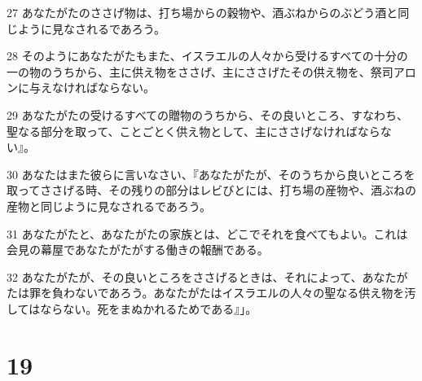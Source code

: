 \par 27 あなたがたのささげ物は、打ち場からの穀物や、酒ぶねからのぶどう酒と同じように見なされるであろう。
\par 28 そのようにあなたがたもまた、イスラエルの人々から受けるすべての十分の一の物のうちから、主に供え物をささげ、主にささげたその供え物を、祭司アロンに与えなければならない。
\par 29 あなたがたの受けるすべての贈物のうちから、その良いところ、すなわち、聖なる部分を取って、ことごとく供え物として、主にささげなければならない』。
\par 30 あなたはまた彼らに言いなさい、『あなたがたが、そのうちから良いところを取ってささげる時、その残りの部分はレビびとには、打ち場の産物や、酒ぶねの産物と同じように見なされるであろう。
\par 31 あなたがたと、あなたがたの家族とは、どこでそれを食べてもよい。これは会見の幕屋であなたがたがする働きの報酬である。
\par 32 あなたがたが、その良いところをささげるときは、それによって、あなたがたは罪を負わないであろう。あなたがたはイスラエルの人々の聖なる供え物を汚してはならない。死をまぬかれるためである』」。

\chapter{19}


